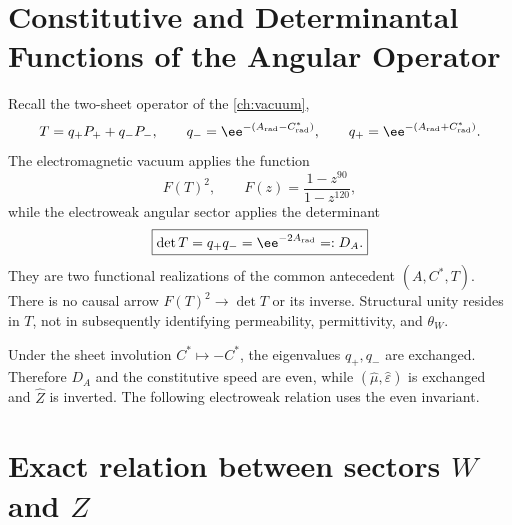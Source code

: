\label{ch:ew}

\section{Constitutive and Determinantal Functions of the Angular Operator}

Recall the two-sheet operator of the \cref{ch:vacuum},
\begin{equation}
\label{eq:ew-angular-operator}
T=q_+P_+ +q_-P_-,
\qquad
q_-=\ee^{-(A_{\rm rad}-C^*_{\rm rad})},
\qquad
q_+=\ee^{-(A_{\rm rad}+C^*_{\rm rad})}.
\end{equation}
The electromagnetic vacuum applies the function
\begin{equation}
\label{eq:ew-vacuum-reader}
F(T)^2,
\qquad
F(z)=\frac{1-z^{90}}{1-z^{120}},
\end{equation}
while the electroweak angular sector applies the determinant
\begin{equation}
\label{eq:ew-determinant-reader}
\boxed{
\det T=q_+q_-=\ee^{-2A_{\rm rad}}=:D_A.}
\end{equation}
They are two functional realizations of the common
antecedent \((A,C^*,T)\). There is no causal arrow
\(F(T)^2\to\det T\) or its inverse. Structural unity resides in
\(T\), not in subsequently identifying permeability,
permittivity, and \(\theta_W\).

Under the sheet involution \(C^*\mapsto-C^*\), the eigenvalues
\(q_+,q_-\) are exchanged. Therefore \(D_A\) and the constitutive speed
are even, while \((\widehat\mu,\widehat\varepsilon)\) is exchanged and
\(\widehat Z\) is inverted. The following electroweak relation uses the
even invariant.

\section{Exact relation between sectors \(W\) and \(Z\)}


